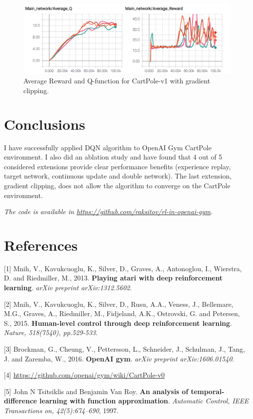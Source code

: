 \documentclass{article}
\begin{document}
\begin{figure}[h]
    \centering
    \includegraphics[width=\textwidth]{gradient}
    \caption{Average Reward and Q-function for CartPole-v1 with gradient clipping.}
\end{figure}

\section{Conclusions}
I have successfully applied DQN algorithm to OpenAI Gym CartPole environment. I also did an ablation study and have found that 4 out of 5 considered extensions provide clear performance benefits (experience replay, target network, continuous update and double network). The last extension, gradient clipping, does not allow the algorithm to converge on the CartPole environment.

{\it The code is available in \url{https://github.com/raksitov/rl-in-openai-gym}.}

\section*{References}

[1] Mnih, V., Kavukcuoglu, K., Silver, D., Graves, A., Antonoglou, I., Wierstra, D. and Riedmiller, M., 2013. {\bf Playing atari with deep reinforcement learning}. {\it arXiv preprint arXiv:1312.5602}.

[2] Mnih, V., Kavukcuoglu, K., Silver, D., Rusu, A.A., Veness, J., Bellemare, M.G., Graves, A., Riedmiller, M., Fidjeland, A.K., Ostrovski, G. and Petersen, S., 2015. {\bf Human-level control through deep reinforcement learning}. {\it Nature, 518(7540), pp.529-533}.

[3] Brockman, G., Cheung, V., Pettersson, L., Schneider, J., Schulman, J., Tang, J. and Zaremba, W., 2016. {\bf OpenAI gym}. {\it arXiv preprint arXiv:1606.01540}.

[4] \url{https://github.com/openai/gym/wiki/CartPole-v0}

[5] John N Tsitsiklis and Benjamin Van Roy. {\bf An analysis of temporal-difference learning with function approximation}. {\it Automatic Control, IEEE Transactions on, 42(5):674–690}, 1997.
\end{document}
